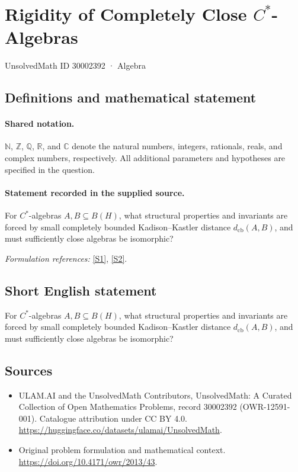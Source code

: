 \documentclass[11pt]{article}
\newcommand{\sref}[2]{\hyperlink{source:#1:#2}{[S#2]}}
\begin{document}
\setcounter{section}{30002391}
\section{\texorpdfstring{Rigidity of Completely Close $C^*$-Algebras}{Rigidity of Completely Close C\textasciicircum{}*-Algebras}}\label{30002392}
{\small UnsolvedMath ID 30002392 · Algebra}
\subsection{Definitions and mathematical statement}

\paragraph{Shared notation.}$\mathbb N$, $\mathbb Z$, $\mathbb Q$, $\mathbb R$, and $\mathbb C$ denote the natural numbers, integers, rationals, reals, and complex numbers, respectively. All additional parameters and hypotheses are specified in the question.


\paragraph{Statement recorded in the supplied source.}
For $C^*$-algebras $A,B\subseteq B(H)$, what structural properties and invariants are forced by small completely bounded Kadison–Kastler distance $d_{\mathrm{cb}}(A,B)$, and must sufficiently close algebras be isomorphic?
\par\smallskip\textit{Formulation references:} \sref{30002392}{1}, \sref{30002392}{2}.
\subsection{Short English statement}
For $C^*$-algebras $A,B\subseteq B(H)$, what structural properties and invariants are forced by small completely bounded Kadison–Kastler distance $d_{\mathrm{cb}}(A,B)$, and must sufficiently close algebras be isomorphic?
\subsection{Sources}
\begin{itemize}
\item[\hypertarget{source:30002392:1}{S1}] ULAM.AI and the UnsolvedMath Contributors, UnsolvedMath: A Curated Collection of Open Mathematics Problems, record 30002392 (OWR-12591-001). Catalogue attribution under CC BY 4.0.
\url{https://huggingface.co/datasets/ulamai/UnsolvedMath}.
\item[\hypertarget{source:30002392:2}{S2}] Original problem formulation and mathematical context.
\url{https://doi.org/10.4171/owr/2013/43}.
\end{itemize}
\label{end:30002392}
\end{document}
